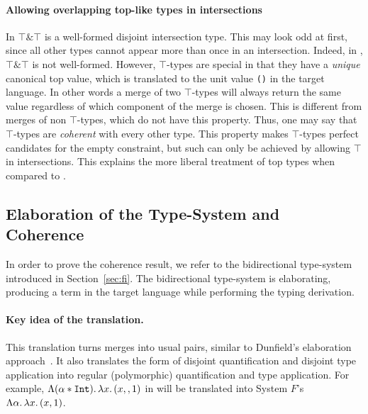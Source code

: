 \paragraph{Allowing overlapping top-like types in intersections} 
In \name $\top \& \top$ is a well-formed disjoint intersection type.
This may look odd at first, since all other types
cannot appear more than once in an intersection. Indeed, in \oldname, 
$\top \& \top$ is not well-formed. However, $\top$-types are special 
in that they have a \emph{unique} canonical top value, which is
translated to the unit value \lstinline{()} in the target language. In
other words a merge of two $\top$-types will always return the same value 
regardless of which component of the merge is chosen. 
This is different 
from merges of non $\top$-types, which do not have this
property.  
Thus, one may say that $\top$-types are \emph{coherent} with every other type.
This property makes $\top$-types perfect candidates for the empty constraint,
but such can only be achieved by allowing $\top$ in intersections.
This explains the more liberal treatment of top types \name when
compared to \oldname.

\subsection{Elaboration of the Type-System and Coherence} 
In order to prove the coherence result, we refer to the bidirectional type-system introduced in
Section~\ref{sec:fi}. 
The bidirectional type-system is elaborating, producing a term in the target language while
performing the typing derivation.

\paragraph{Key idea of the translation.}
This translation turns merges into usual pairs, similar to Dunfield's
elaboration approach~\cite{dunfield2014elaborating}.
It also translates the form of disjoint quantification and disjoint type application into regular (polymorphic) 
quantification and type application. 
For example, $\Lambda (\alpha*\texttt{Int}).\, \lambda x.\, (x ,, 1)$ in \name will be translated into System $F$'s 
$\Lambda \alpha.\, \lambda x.\, (x, 1)$.
\begin{comment}
This is achieved by means of the type-directed translation.
Note that, when performing type application, the type-system will ensure that the type being applied is compatible
with the disjoint constraint, otherwise the program is rejected.
For example, applying the term above to $\tychar$ would be accepted, and the generated term would translate this
into System $F$'s type application.
On the other hand, applying the term to $\tyint$ would be rejected, and hence the target term produced is meaningless.
\end{comment}

